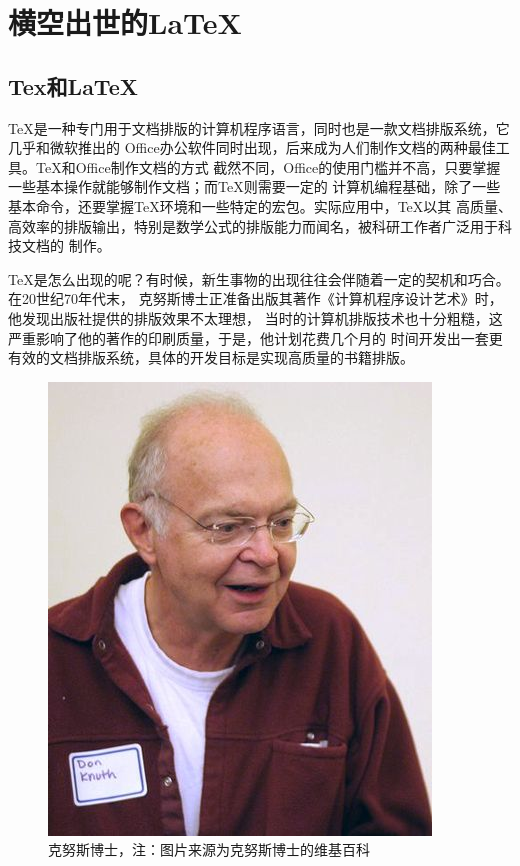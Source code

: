 \chapter{横空出世的\LaTeX }
\section{Tex和\LaTeX }
TeX是一种专门用于文档排版的计算机程序语言，同时也是一款文档排版系统，它几乎和微软推出的
Office办公软件同时出现，后来成为人们制作文档的两种最佳工具。TeX和Office制作文档的方式
截然不同，Office的使用门槛并不高，只要掌握一些基本操作就能够制作文档；而TeX则需要一定的
计算机编程基础，除了一些基本命令，还要掌握TeX环境和一些特定的宏包。实际应用中，TeX以其
高质量、高效率的排版输出，特别是数学公式的排版能力而闻名，被科研工作者广泛用于科技文档的
制作。

TeX是怎么出现的呢？有时候，新生事物的出现往往会伴随着一定的契机和巧合。在20世纪70年代末，
克努斯博士正准备出版其著作《计算机程序设计艺术》时，他发现出版社提供的排版效果不太理想，
当时的计算机排版技术也十分粗糙，这严重影响了他的著作的印刷质量，于是，他计划花费几个月的
时间开发出一套更有效的文档排版系统，具体的开发目标是实现高质量的书籍排版。

\begin{figure}
      \centering
      \includegraphics[scale=0.6]{images/Donald_Knuth.jpeg}
      \caption{克努斯博士，注：图片来源为克努斯博士的维基百科}
\end{figure}

